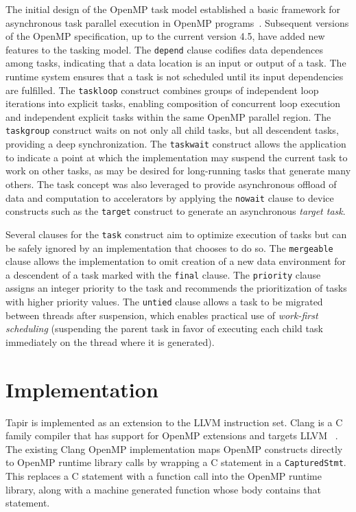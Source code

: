 \documentclass[sigconf]{acmart}
\begin{document}
The initial design of the OpenMP task model established 
a basic framework for asynchronous task parallel execution in OpenMP programs~\cite{ayguade09design}.
Subsequent versions of the OpenMP specification, up to the current version 4.5, 
have added new features to the tasking model.  The \texttt{depend} 
clause codifies data dependences among tasks, indicating that a data location 
is an input or output of a task.  The runtime system ensures that a task is 
not scheduled until its input dependencies are fulfilled.  The \texttt{taskloop} 
construct combines groups of independent loop iterations into explicit tasks, 
enabling composition of concurrent loop execution and independent explicit 
tasks within the same OpenMP parallel region. The \texttt{taskgroup} construct 
waits on not only all child tasks, but all descendent tasks, providing a deep 
synchronization. The \texttt{taskwait} construct allows the application to 
indicate a point at which the implementation may suspend the current task to 
work on other tasks, as may be desired for long-running tasks that generate 
many others.  The task concept was also leveraged to provide asynchronous 
offload of data and computation to accelerators by applying the \texttt{nowait} 
clause to device constructs such as the \texttt{target} construct to generate an 
asynchronous \textit{target task}.

Several clauses for the \texttt{task} construct aim to optimize execution of 
tasks but can be safely ignored by an implementation that chooses to do so. 
The \texttt{mergeable} clause allows the implementation to omit creation of a 
new data environment for a descendent of a task marked with the \texttt{final}
clause.  The \texttt{priority} clause assigns an integer priority to the task 
and recommends the prioritization of tasks with higher priority values.
The \texttt{untied} clause allows a task to be migrated between threads after 
suspension, which enables practical use of \textit{work-first scheduling} 
(suspending the parent task in favor of executing each child task immediately 
on the thread where it is generated).

\section{Implementation} \label{Sec:Implementation}

Tapir is implemented as an extension to the LLVM instruction set. Clang is a C
family compiler that has support for OpenMP extensions and targets
LLVM~ \cite{clang}. The existing Clang OpenMP implementation maps OpenMP constructs directly
to OpenMP runtime library calls by wrapping a C statement in a
\texttt{CapturedStmt}. This replaces a C statement with a function call into
the OpenMP runtime library, along with a machine generated function whose body
contains that statement.   
\end{document}
